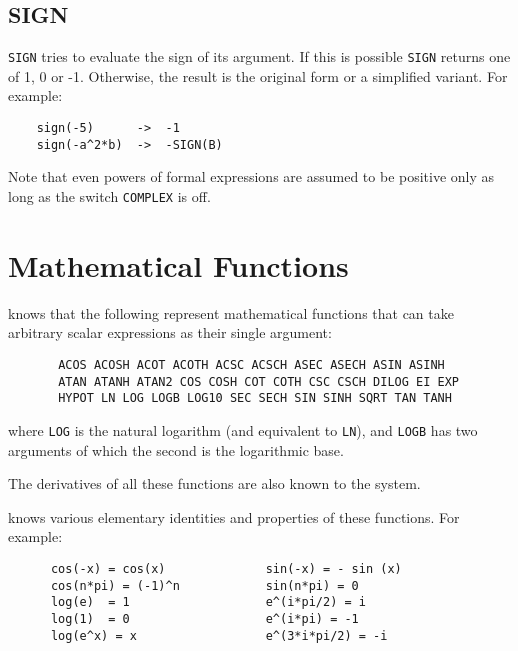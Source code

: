 \subsection{SIGN}
{\tt SIGN} tries to evaluate the sign of its argument. If this
is possible {\tt SIGN} returns one of 1, 0 or -1.  Otherwise, the result
is the original form or a simplified variant. For example:
\begin{verbatim}
	sign(-5)      ->  -1
	sign(-a^2*b)  ->  -SIGN(B)
\end{verbatim}
Note that even powers of formal expressions are assumed to be
positive only as long as the switch {\tt COMPLEX} is off.

\section{Mathematical Functions}

{\REDUCE} knows that the following represent mathematical functions
 that can
take arbitrary scalar expressions as their single argument:
\begin{verbatim}
       ACOS ACOSH ACOT ACOTH ACSC ACSCH ASEC ASECH ASIN ASINH
       ATAN ATANH ATAN2 COS COSH COT COTH CSC CSCH DILOG EI EXP
       HYPOT LN LOG LOGB LOG10 SEC SECH SIN SINH SQRT TAN TANH
\end{verbatim}
where {\tt LOG} is the natural logarithm (and equivalent to {\tt LN}),
and {\tt LOGB} has two arguments of which the second is the logarithmic base.

The derivatives of all these functions are also known to the system.

{\REDUCE} knows various elementary identities and properties
of these functions. For example:
\begin{verbatim}
      cos(-x) = cos(x)              sin(-x) = - sin (x)
      cos(n*pi) = (-1)^n            sin(n*pi) = 0
      log(e)  = 1                   e^(i*pi/2) = i
      log(1)  = 0                   e^(i*pi) = -1
      log(e^x) = x                  e^(3*i*pi/2) = -i
\end{verbatim}

